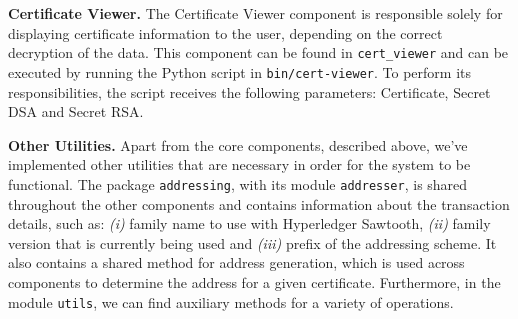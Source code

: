 \textbf{Certificate Viewer.} The Certificate Viewer component is responsible solely for displaying certificate information to the user, depending on the correct decryption of the data.  This component can be found in \texttt{cert\_viewer} and can be executed by running the Python script in \texttt{bin/cert-viewer}. To perform its responsibilities, the script receives the following parameters: Certificate, Secret DSA and Secret RSA.

\textbf{Other Utilities.} Apart from the core components, described above, we've implemented other utilities that are necessary in order for the system to be functional. The package \texttt{addressing}, with its module \texttt{addresser}, is shared throughout the other components and contains  information about the transaction details, such as: \emph{(i)} family name to use with Hyperledger Sawtooth, \emph{(ii)} family version that is currently being used and \emph{(iii)} prefix of the addressing scheme. It also contains a shared method for address generation, which is used across components to determine the address for a given certificate. Furthermore, in the module \texttt{utils}, we can find auxiliary methods for a variety of operations.
